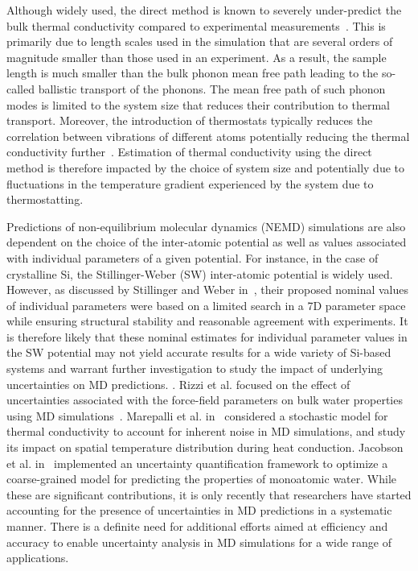 Although widely used, the direct method is known to severely under-predict
the bulk thermal conductivity compared to experimental 
measurements~\cite{Haynes:2014,Shanks:1963}. This is primarily
due to length scales used in the simulation that are several orders of magnitude smaller
than those used in an experiment. As a result, the sample length is much smaller than the
bulk phonon mean free path leading to the so-called ballistic transport of the phonons.
The mean free path of such phonon modes is limited to the system size that reduces their
contribution to thermal transport. Moreover, the
introduction of thermostats typically reduces the correlation between vibrations of 
different atoms potentially reducing the thermal conductivity
further~\cite{Evans:2008}.  Estimation of thermal conductivity using the
direct method is therefore impacted by the choice of system size and potentially due to
fluctuations in the temperature gradient experienced by the system due to thermostatting.  

Predictions of non-equilibrium molecular dynamics (NEMD) simulations are also dependent on the
choice of the inter-atomic potential as well as values associated with individual parameters
of a given potential. For instance, in the case of crystalline Si, the Stillinger-Weber (SW)
inter-atomic potential is widely used. However, as discussed by Stillinger and Weber
in~\cite{Stillinger:1985}, their proposed nominal values of individual parameters were based
on a limited search in a 7D parameter space while ensuring structural stability and
reasonable agreement with experiments. It is therefore likely that these nominal estimates
for individual parameter values in the SW potential may not yield accurate results for a
wide variety of Si-based systems and warrant further investigation to study the impact of
underlying uncertainties on MD predictions. .
Rizzi et al. focused on the effect of
uncertainties associated with the force-field parameters on bulk water properties using MD
simulations~\cite{Rizzi:2012}. Marepalli et al. in~\cite{Marepalli:2014} considered a stochastic model
for thermal conductivity to account for inherent noise in MD simulations, and study its impact on
spatial temperature 
distribution during heat conduction. Jacobson et al. in~\cite{Jacobson:2014} implemented an uncertainty
quantification framework to optimize a coarse-grained model for predicting the properties of monoatomic
 water. While these are significant contributions, it is only recently 
that researchers have started accounting for the presence of uncertainties in MD predictions in a
systematic manner. There is a definite need for additional efforts aimed at efficiency and accuracy
to enable uncertainty analysis in MD simulations for a wide range of applications.

